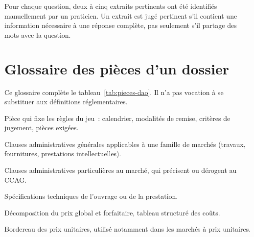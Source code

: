 Pour chaque question, deux à cinq extraits pertinents ont été identifiés
manuellement par un praticien. Un extrait est jugé pertinent s'il
contient une information nécessaire à une réponse complète, pas seulement
s'il partage des mots avec la question.

\chapter{Glossaire des pièces d'un dossier}
\label{annexe:pieces}

Ce glossaire complète le tableau~\ref{tab:pieces-dao}. Il n'a pas vocation
à se substituer aux définitions réglementaires.

\begin{description}[style=nextline, leftmargin=1.2em, labelindent=0pt, font=\bfseries\color{btpdeep}]
  \item[Règlement de consultation.] Pièce qui fixe les règles du jeu~:
        calendrier, modalités de remise, critères de jugement, pièces
        exigées.
  \item[CCAG.] Clauses administratives générales applicables à une
        famille de marchés (travaux, fournitures, prestations
        intellectuelles).
  \item[CCAP.] Clauses administratives particulières au marché, qui
        précisent ou dérogent au CCAG.
  \item[CCTP.] Spécifications techniques de l'ouvrage ou de la
        prestation.
  \item[DPGF.] Décomposition du prix global et forfaitaire, tableau
        structuré des coûts.
  \item[BPU.] Bordereau des prix unitaires, utilisé notamment dans les
        marchés à prix unitaires.
\end{description}

\btpEndMark
\clearpage
